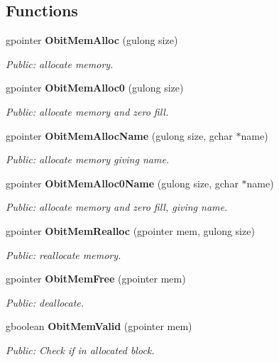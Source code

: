 \subsection*{Functions}
\begin{CompactItemize}
\item 
gpointer {\bf Obit\-Mem\-Alloc} (gulong size)
\begin{CompactList}\small\item\em Public: allocate memory. \item\end{CompactList}\item 
gpointer {\bf Obit\-Mem\-Alloc0} (gulong size)
\begin{CompactList}\small\item\em Public: allocate memory and zero fill. \item\end{CompactList}\item 
gpointer {\bf Obit\-Mem\-Alloc\-Name} (gulong size, gchar $\ast$name)
\begin{CompactList}\small\item\em Public: allocate memory giving name. \item\end{CompactList}\item 
gpointer {\bf Obit\-Mem\-Alloc0Name} (gulong size, gchar $\ast$name)
\begin{CompactList}\small\item\em Public: allocate memory and zero fill, giving name. \item\end{CompactList}\item 
gpointer {\bf Obit\-Mem\-Realloc} (gpointer mem, gulong size)
\begin{CompactList}\small\item\em Public: reallocate memory. \item\end{CompactList}\item 
gpointer {\bf Obit\-Mem\-Free} (gpointer mem)
\begin{CompactList}\small\item\em Public: deallocate. \item\end{CompactList}\item 
gboolean {\bf Obit\-Mem\-Valid} (gpointer mem)
\begin{CompactList}\small\item\em Public: Check if in allocated block. \item\end{CompactList}\item 

\end{CompactItemize}
